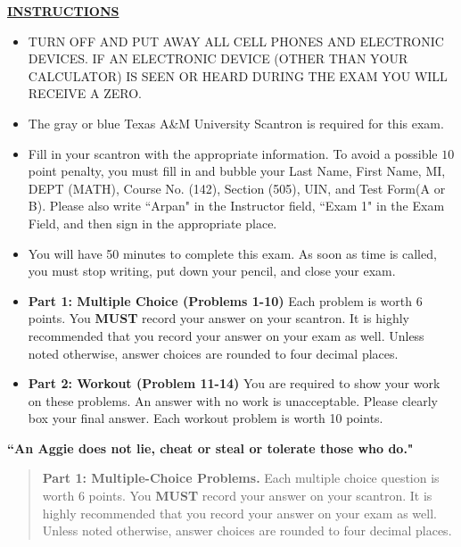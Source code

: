 \documentclass[11pt]{article}
\begin{document}
\normalsize
\vfill
\underline{\bf INSTRUCTIONS}
\begin{itemize}
\item TURN OFF AND PUT AWAY ALL CELL PHONES AND ELECTRONIC DEVICES.  IF AN ELECTRONIC DEVICE (OTHER THAN YOUR CALCULATOR) IS SEEN OR HEARD DURING THE EXAM YOU WILL RECEIVE A ZERO.

\item The gray or blue Texas A\&M University Scantron is required for this exam.

\item Fill in your scantron with the appropriate information.  To avoid a possible $10$ point penalty, you must fill in and bubble your Last Name, First Name, MI, DEPT
(MATH), Course No. (142), Section (505), UIN, and Test Form(A or B).  Please also write ``Arpan" in the Instructor field, ``Exam 1" in the Exam Field, and then sign in the appropriate place.

\item You will have 50 minutes to complete this exam.  As soon as time is called, you must stop writing, put down your pencil, and close your exam.

\item {\bf Part 1: Multiple Choice (Problems 1-10)} Each problem is worth 6 points.  You \textbf{MUST} record your answer on your scantron.  It is highly recommended that you record your answer on your exam as well.  Unless noted otherwise, answer choices are rounded to four decimal places.

\item {\bf Part 2:  Workout (Problem 11-14)}  You are required to show your work on these problems.  An answer with no work is unacceptable.  Please clearly box your final answer.  Each workout problem is worth 10 points.

\end{itemize}
\vfill
\begin{center}
{\bf \LARGE ``An Aggie does not lie, cheat or steal or tolerate those who do."}
\end{center}
\newpage



\begin{quote}
\textbf{Part 1:  Multiple-Choice Problems.}  Each multiple choice question is worth 6 points.  You \textbf{MUST} record your answer on your scantron.  It is highly recommended that you
record your answer on your exam as well.  Unless noted otherwise, answer choices are rounded to four decimal places.
\end{quote}
\end{document}
